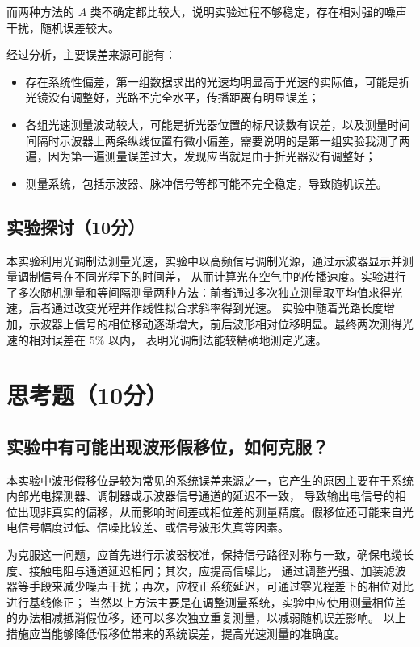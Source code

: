 \documentclass{Phyport}
\begin{document}
而两种方法的 $A$ 类不确定都比较大，说明实验过程不够稳定，存在相对强的噪声干扰，随机误差较大。

经过分析，主要误差来源可能有：
\begin{itemize}
    \item 存在系统性偏差，第一组数据求出的光速均明显高于光速的实际值，可能是折光镜没有调整好，光路不完全水平，传播距离有明显误差；
    \item 各组光速测量波动较大，可能是折光器位置的标尺读数有误差，以及测量时间间隔时示波器上两条纵线位置有微小偏差，需要说明的是第一组实验我测了两遍，因为第一遍测量误差过大，发现应当就是由于折光器没有调整好；
    \item 测量系统，包括示波器、脉冲信号等都可能不完全稳定，导致随机误差。
\end{itemize}


\subsection{实验探讨（10分）}

本实验利用光调制法测量光速，实验中以高频信号调制光源，通过示波器显示并测量调制信号在不同光程下的时间差，
从而计算光在空气中的传播速度。实验进行了多次随机测量和等间隔测量两种方法：前者通过多次独立测量取平均值求得光速，后者通过改变光程并作线性拟合求斜率得到光速。
实验中随着光路长度增加，示波器上信号的相位移动逐渐增大，前后波形相对位移明显。最终两次测得光速的相对误差在 $5\%$ 以内，
表明光调制法能较精确地测定光速。


\section{思考题（10分）}

\subsection{实验中有可能出现波形假移位，如何克服？}

本实验中波形假移位是较为常见的系统误差来源之一，它产生的原因主要在于系统内部光电探测器、调制器或示波器信号通道的延迟不一致，
导致输出电信号的相位出现非真实的偏移，从而影响时间差或相位差的测量精度。假移位还可能来自光电信号幅度过低、信噪比较差、或信号波形失真等因素。

为克服这一问题，应首先进行示波器校准，保持信号路径对称与一致，确保电缆长度、接触电阻与通道延迟相同；其次，应提高信噪比，
通过调整光强、加装滤波器等手段来减少噪声干扰；再次，应校正系统延迟，可通过零光程差下的相位对比进行基线修正；
当然以上方法主要是在调整测量系统，实验中应使用测量相位差的办法相减抵消假位移，还可以多次独立重复测量，以减弱随机误差影响。
以上措施应当能够降低假移位带来的系统误差，提高光速测量的准确度。
\end{document}
